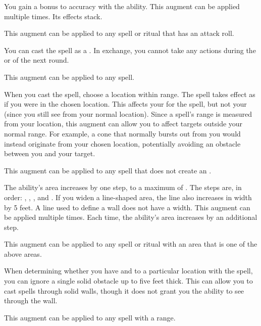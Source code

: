              You gain a  bonus to accuracy with the ability.
            This augment can be applied multiple times.
            Its effects stack.
            \par This augment can be applied to any spell or ritual that has an attack roll.

             You can cast the spell as a .
            In exchange, you cannot take any actions during the  or  of the next round.
            \par This augment can be applied to any spell.

             When you cast the spell, choose a location within \rngclose range.
            The spell takes effect as if you were in the chosen location.
            This affects your  for the spell, but not your  (since you still see from your normal location).
            Since a spell's range is measured from your location, this augment can allow you to affect targets outside your normal range.
            For example, a cone that normally bursts out from you would instead originate from your chosen location, potentially avoiding an obstacle between you and your target.
            \par This augment can be applied to any spell that does not create an .

             The ability's area increases by one step, to a maximum of \areahuge.
            The steps are, in order: \areasmall, \areamed, \arealarge, and \areahuge.
            If you widen a line-shaped area, the line also increases in width by 5 feet.
            A line used to define a wall does not have a width.
            This augment can be applied multiple times.
            Each time, the ability's area increases by an additional step.
            \par This augment can be applied to any spell or ritual with an area that is one of the above areas.

             When determining whether you have  and  to a particular location with the spell, you can ignore a single solid obstacle up to five feet thick.
            This can allow you to cast spells through solid walls, though it does not grant you the ability to see through the wall.
            \par This augment can be applied to any spell with a range.

